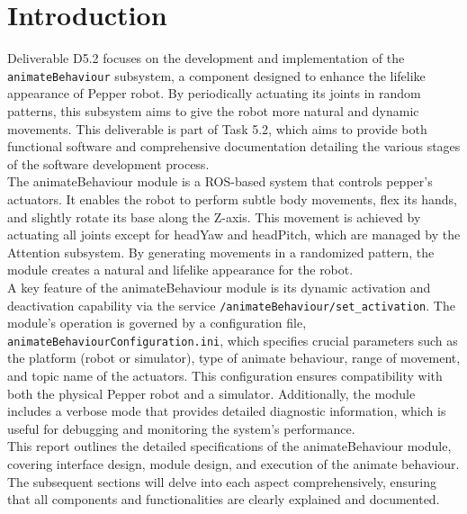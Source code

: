 \documentclass{CSSRforAfrica}
\begin{document}
\label{executive_summary}

\pagebreak
\tableofcontents

\newpage

\pagebreak

\section{Introduction}
Deliverable D5.2 focuses on the development and implementation of the \texttt{animateBehaviour} subsystem, a component designed to enhance the lifelike appearance of Pepper robot. By periodically actuating its joints in random patterns, this subsystem aims to give the robot more natural and dynamic movements. This deliverable is part of Task 5.2, which aims to provide both functional software and comprehensive documentation detailing the various stages of the software development process.\\[1em]
The animateBehaviour module is a ROS-based system that controls pepper's actuators.  It enables the robot to perform subtle body movements, flex its hands, and slightly rotate its base along the Z-axis. This movement is achieved by actuating all joints except for headYaw and headPitch, which are managed by the Attention subsystem. By generating movements in a randomized pattern, the module creates a natural and lifelike appearance for the robot.\\[1em]
A key feature of the animateBehaviour module is its dynamic activation and deactivation capability via the service \texttt{/animateBehaviour/set\_activation}. The module's operation is governed by a configuration file, \texttt{animateBehaviourConfiguration.ini}, which specifies crucial parameters such as the platform (robot or simulator), type of animate behaviour, range of movement, and topic name of the actuators. This configuration ensures compatibility with both the physical Pepper robot and a simulator. Additionally, the module includes a verbose mode that provides detailed diagnostic information, which is useful for debugging and monitoring the system’s performance.\\[1em]
This report outlines the detailed specifications of the animateBehaviour module, covering interface design, module design, and execution of the animate behaviour. The subsequent sections will delve into each aspect comprehensively, ensuring that all components and functionalities are clearly explained and documented.\\[1em]
\newpage
\end{document}
